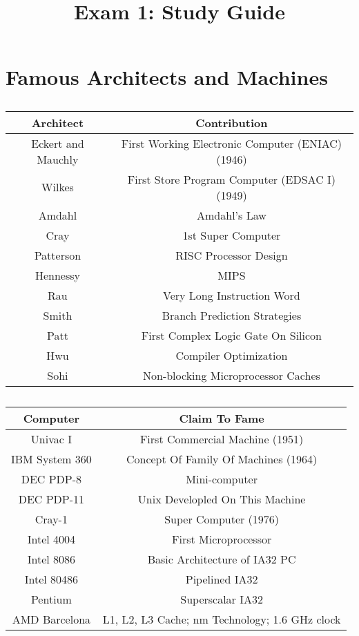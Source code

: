 \documentclass[12pt]{article}
\begin{document}
	
\title{Exam 1: Study Guide}
\author{}
\date{}

\maketitle

\section{Famous Architects and Machines}

\subsection*{}
\begin{tabular}{|c|c|}
	\hline
	\textbf{Architect} & \textbf{Contribution}\\
	\hline
	Eckert and Mauchly & First Working Electronic Computer (ENIAC)(1946)\\
	\hline
	Wilkes & First Store Program Computer (EDSAC I) (1949)\\
	\hline
	Amdahl & Amdahl's Law\\
	\hline
	Cray & 1st Super Computer\\
	\hline
	Patterson & RISC Processor Design\\
	\hline
	Hennessy & MIPS\\
	\hline
	Rau & Very Long Instruction Word\\
	\hline
	Smith & Branch Prediction Strategies\\
	\hline
	Patt & First Complex Logic Gate On Silicon\\
	\hline
	Hwu & Compiler Optimization\\
	\hline
	Sohi & Non-blocking Microprocessor Caches\\
	\hline
\end{tabular}

\subsection*{}
\begin{tabular}{|c|c|}
	\hline
	\textbf{Computer} & \textbf{Claim To Fame}\\
	\hline
	Univac I & First Commercial Machine (1951)\\
	\hline
	IBM System 360 & Concept Of Family Of Machines (1964)\\
	\hline
	DEC PDP-8 & Mini-computer\\
	\hline
	DEC PDP-11 & Unix Developled On This Machine\\
	\hline
	Cray-1 & Super Computer (1976)\\
	\hline
	Intel 4004 & First Microprocessor\\
	\hline
	Intel 8086 & Basic Architecture of IA32 PC\\
	\hline
	Intel 80486 & Pipelined IA32 \\
	\hline
	Pentium & Superscalar IA32 \\
	\hline
	AMD Barcelona & L1, L2, L3 Cache; nm Technology; 1.6 GHz clock\\
	\hline
\end{tabular}
\end{document}
